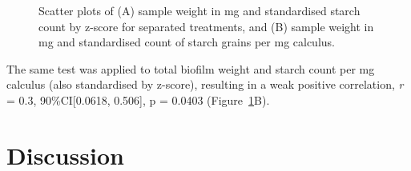 \documentclass[
  b5paper,
]{book}
\begin{document}
\begin{figure}[H]


\caption{\label{fig-cor-plot}Scatter plots of (A) sample weight in mg
and standardised starch count by z-score for separated treatments, and
(B) sample weight in mg and standardised count of starch grains per mg
calculus.}

\end{figure}%

The same test was applied to total biofilm weight and starch count per
mg calculus (also standardised by z-score), resulting in a weak positive
correlation, \emph{r} = 0.3, 90\%CI{[}0.0618, 0.506{]}, p = 0.0403
(Figure~\ref{fig-cor-plot}B).

\section{Discussion}\label{discussion-1}
\end{document}
